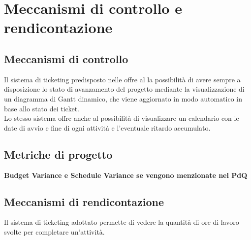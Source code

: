 \section{Meccanismi di controllo e rendicontazione}

\subsection{Meccanismi di controllo}

Il sistema di ticketing predisposto nelle \normeDiProgetto offre al \rRP la possibilità di avere sempre a disposizione lo stato di avanzamento del progetto mediante la visualizzazione di un diagramma di Gantt dinamico, che viene aggiornato in modo automatico in base allo stato dei ticket. \\
Lo stesso sistema offre anche al possibilità di visualizzare un calendario con le date di avvio e fine di ogni attività e l'eventuale ritardo accumulato.\\


\subsection{Metriche di progetto}

\textbf{Budget Variance e Schedule Variance se vengono menzionate nel PdQ}

\subsection{Meccanismi di rendicontazione}

Il sistema di ticketing adottato permette di vedere la quantità di ore di lavoro svolte per completare un'attività. \\
